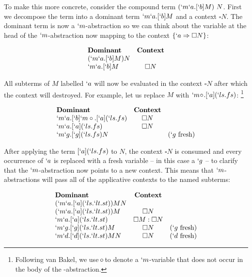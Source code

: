   To make this more concrete, consider the compound term $(`m`a.[`b]M)\ N$. 
  First we decompose the term into a dominant term $`m`a.[`b]M$ and a context $\square N$. 
  The dominant term is now a $`m$-abstraction so we can think about the variable at the head of the $`m$-abstraction now mapping to the context $\{`a \Rightarrow \square N\}$:
  
  \begin{example}[]
  \[
  \begin{array}{lc}
    \textbf{Dominant} & \textbf{Context} \\
    (`m`a.[`b]M) N \\
    `m`a.[`b]M & \square N \\
  \end{array}
  \]
  \end{example}

  All subterms of $M$ labelled $`a$ will now be evaluated in the context $\square N$ after which the context will destroyed. 
  For example, let us replace $M$ with \mbox{$`m\!\circ\!.[`a](`ls.fs)$}:
  \footnote{Following van Bakel, we use $\!\circ\!$ to denote a $`m$-variable that does not occur in the body of the \lmu-abstraction.}
  
  \begin{example}
    \[
    \begin{array}{lcr}
    \textbf{Dominant} & \textbf{Context} \\
    `m`a.[`b]`m\circ.[`a](`ls.fs)    & \square N \\
    `m`a.[`a](`ls.fs)    & \square N \\
    `m`g.[`g](`ls.fs)N   & & (`g\ \text{fresh})  \\
    \end{array}
    \]
  \end{example}

  After applying the term $[`a](`ls.fs)$ to $N$, 
  the context $\square N$ is consumed and every occurrence of $`a$ is replaced with a fresh variable 
  -- in this case a $`g$ -- 
  to clarify that the $`m$-abstraction now points to a new context. 
  This means that $`m$-abstractions will pass all of the applicative contexts to the named subterms:
  
  \begin{example}
    \[
    \begin{array}{lcr}
    \textbf{Dominant} & \textbf{Context} \\
    (`m`a.[`a](`ls.`lt.st)) M N \\
    (`m`a.[`a](`ls.`lt.st))M & \square N \\
    `m`a.[`a](`ls.`lt.st) & \square M:\square N \\
    `m`g.[`g](`ls.`lt.st)M & \square N & (`g\ \text{fresh}) \\
    `m`d.[`d](`ls.`lt.st)MN & \square N & (`d\ \text{fresh}) \\
    \end{array}
    \]
  \end{example}
  

